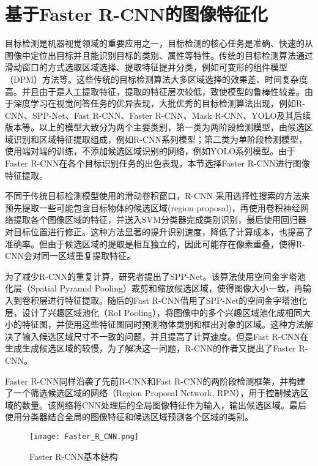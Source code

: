 \section{基于Faster R-CNN的图像特征化}
目标检测是机器视觉领域的重要应用之一，目标检测的核心任务是准确、快速的从图像中定位出目标并且能识别目标的类别、属性等特性。传统的目标检测算法通过滑动窗口的方式选取区域选择、提取特征提并分类，例如可变形的组件模型（DPM）方法等。这些传统的目标检测算法大多区域选择的效果差、时间复杂度高。并且由于是人工提取特征，提取的特征层次较低，致使模型的鲁棒性较差。由于深度学习在视觉问答任务的优异表现，大批优秀的目标检测算法出现，例如R-CNN、SPP-Net、Fast R-CNN、Faster R-CNN、Mask R-CNN、YOLO及其后续版本等。以上的模型大致分为两个主要类别，第一类为两阶段检测模型，由候选区域识别和区域特征提取组成，例如R-CNN系列模型；第二类为单阶段检测模型，使用端对端的训练，不添加候选区域识别的网络，例如YOLO系列模型。由于Faster R-CNN在各个目标识别任务的出色表现，本节选择Faster R-CNN进行图像特征提取。

不同于传统目标检测模型使用的滑动卷积窗口，R-CNN 采用选择性搜索的方法来预先提取一些可能包含目标物体的候选区域(region proposal)，再使用卷积神经网络提取各个图像区域的特征，并送入SVM分类器完成类别识别，最后使用回归器对目标位置进行修正。这种方法显著的提升识别速度，降低了计算成本，也提高了准确率。但由于候选区域的提取是相互独立的，因此可能存在像素重叠，使得R-CNN会对同一区域重复提取特征。

为了减少R-CNN的重复计算，研究者提出了SPP-Net。该算法使用空间金字塔池化层（Spatial Pyramid Pooling）裁剪和缩放候选区域，使得图像大小一致，再输入到卷积层进行特征提取。随后的Fast R-CNN借用了SPP-Net的空间金字塔池化层，设计了兴趣区域池化（RoI Pooling），将图像中的多个兴趣区域池化成相同大小的特征图，并使用这些特征图同时预测物体类别和框出对象的区域。这种方法解决了输入候选区域尺寸不一致的问题，并且提高了计算速度。但是Fast R-CNN在生成生成候选区域的较慢，为了解决这一问题，R-CNN的作者又提出了Faster R-CNN。

Faster R-CNN同样沿袭了先前R-CNN和Fast R-CNN的两阶段检测框架，并构建了一个筛选候选区域的网络（Region Proposal Network, RPN），用于控制候选区域的数量。该网络将CNN处理后的全局图像特征作为输入，输出候选区域。最后使用分类器结合全局的图像特征和候选区域预测各个区域的类别。
\begin{figure}[H]
	\texttt{[image: Faster\_R\_CNN.png]}
	\caption{Faster R-CNN基本结构}
	\label{Faster_R_CNN}
\end{figure}

